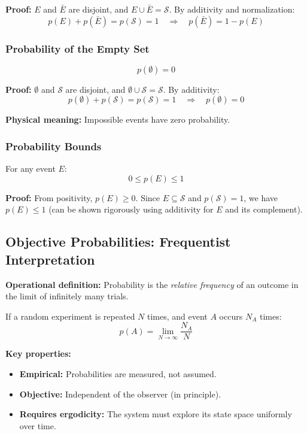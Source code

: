 \documentclass[9pt,twocoloumn]{article}
\begin{document}
\textbf{Proof:} $E$ and $\bar{E}$ are disjoint, and $E \cup \bar{E} = \mathcal{S}$. By additivity and normalization:
\begin{equation}
p(E) + p(\bar{E}) = p(\mathcal{S}) = 1 \quad \Rightarrow \quad p(\bar{E}) = 1 - p(E)
\end{equation}

\subsubsection{Probability of the Empty Set}
\begin{equation}
p(\emptyset) = 0
\end{equation}

\textbf{Proof:} $\emptyset$ and $\mathcal{S}$ are disjoint, and $\emptyset \cup \mathcal{S} = \mathcal{S}$. By additivity:
\begin{equation}
p(\emptyset) + p(\mathcal{S}) = p(\mathcal{S}) = 1 \quad \Rightarrow \quad p(\emptyset) = 0
\end{equation}

\textbf{Physical meaning:} Impossible events have zero probability.

\subsubsection{Probability Bounds}
For any event $E$:
\begin{equation}
0 \leq p(E) \leq 1
\end{equation}

\textbf{Proof:} From positivity, $p(E) \geq 0$. Since $E \subseteq \mathcal{S}$ and $p(\mathcal{S}) = 1$, we have $p(E) \leq 1$ (can be shown rigorously using additivity for $E$ and its complement).

\subsection{Objective Probabilities: Frequentist Interpretation}

\textbf{Operational definition:} Probability is the \emph{relative frequency} of an outcome in the limit of infinitely many trials.

If a random experiment is repeated $N$ times, and event $A$ occurs $N_A$ times:
\begin{equation}
\boxed{p(A) = \lim_{N \to \infty} \frac{N_A}{N}}
\end{equation}

\textbf{Key properties:}
\begin{itemize}
    \item \textbf{Empirical:} Probabilities are measured, not assumed.
    \item \textbf{Objective:} Independent of the observer (in principle).
    \item \textbf{Requires ergodicity:} The system must explore its state space uniformly over time.
\end{itemize}
\end{document}
